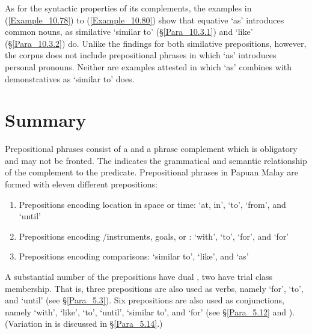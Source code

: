 As for the syntactic properties of its complements, the examples in (\ref{Example_10.78}) to (\ref{Example_10.80}) show that equative  ‘as’ introduces common nouns, as similative  ‘similar to’ (§\ref{Para_10.3.1}) and  ‘like’ (§\ref{Para_10.3.2}) do. Unlike the findings for both similative prepositions, however, the corpus does not include prepositional phrases in which  ‘as’ introduces personal pronouns. Neither are examples attested in which  ‘as’ combines with demonstratives as  ‘similar to’ does.


\section{Summary}
\label{Para_10.4}
Prepositional phrases consist of a  and a  phrase complement which is obligatory and may not be fronted. The  indicates the grammatical and semantic relationship of the complement to the predicate. Prepositional phrases in Papuan Malay are formed with eleven different prepositions:



\begin{enumerate}
\item 
Prepositions encoding location in space or time:  ‘at, in’,  ‘to’,  ‘from’, and  ‘until’

\item 
Prepositions encoding /instruments, goals, or :  ‘with’,  ‘to’,  ‘for’, and  ‘for’

\item 
Prepositions encoding comparisons:  ‘similar to’,  ‘like’, and  ‘as’

\end{enumerate}

A substantial number of the prepositions have dual , two have trial class membership. That is, three prepositions are also used as verbs, namely  ‘for’,  ‘to’, and  ‘until’ (see §\ref{Para_5.3}). Six prepositions are also used as conjunctions, namely  ‘with’,  ‘like’,  ‘to’,  ‘until’,  ‘similar to’, and  ‘for’ (see §\ref{Para_5.12} and ). (Variation in  is discussed in §\ref{Para_5.14}.)



